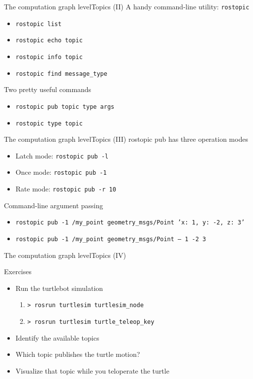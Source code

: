 \documentclass[10pt,compress]{beamer} %
\begin{document}
\begin{frame}{The computation graph level}{Topics (II)}
	A handy command-line utility: \alert{\texttt{rostopic}}
  	\begin{itemize}
		\item \texttt{rostopic list}
		\item \texttt{rostopic echo topic}
		\item \texttt{rostopic info topic}
		\item \texttt{rostopic find message\_type}
	\end{itemize}
	Two pretty useful commands
  	\begin{itemize}
		\item \texttt{rostopic pub topic type args}
		\item \texttt{rostopic type topic}
	\end{itemize}
\end{frame}

\begin{frame}{The computation graph level}{Topics (III)}
	rostopic pub has three operation modes
  	\begin{itemize}
		\item Latch mode: \texttt{rostopic pub -l}
		\item Once mode: \texttt{rostopic pub -1}
		\item Rate mode: \texttt{rostopic pub -r 10}
	\end{itemize}
	Command-line argument passing
  	\begin{itemize}
		\item \texttt{rostopic pub -1 /my\_point geometry\_msgs/Point '{x: 1, y: -2, z: 3}'}
		\item \texttt{rostopic pub -1 /my\_point geometry\_msgs/Point -- 1 -2 3}
	\end{itemize}
\end{frame}

\begin{frame}{The computation graph level}{Topics (IV)}
	\begin{block}{Exercises}
  	\begin{itemize}
		\item Run the turtlebot simulation
			\begin{enumerate}
			\item \texttt{> rosrun turtlesim turtlesim\_node}
			\item \texttt{> rosrun turtlesim turtle\_teleop\_key}
			\end{enumerate}
		\item Identify the available topics
		\item Which topic publishes the turtle motion?
		\item Visualize that topic while you teloperate the turtle
	\end{itemize}
	\end{block}
\end{frame}
\end{document}
